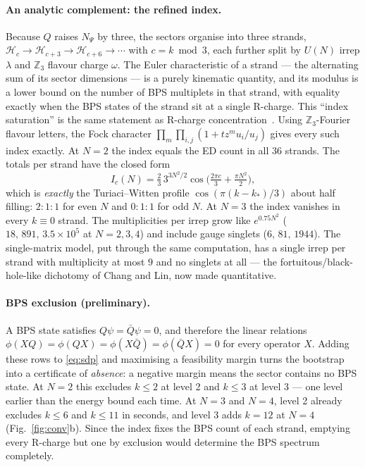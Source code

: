 \documentclass[10pt]{article}
\newcommand{\bQ}{\bar Q}
\begin{document}
\paragraph{An analytic complement: the refined index.}
Because $Q$ raises $N_\Psi$ by three, the sectors organise into three strands, $\mathcal H_c\to\mathcal H_{c+3}\to\mathcal H_{c+6}\to\cdots$ with $c=k\bmod3$, each further split by $U(N)$ irrep $\lambda$ and $\mathbb Z_3$ flavour charge $\omega$. The Euler characteristic of a strand --- the alternating sum of its sector dimensions --- is a purely kinematic quantity, and its modulus is a lower bound on the number of BPS multiplets in that strand, with equality exactly when the BPS states of the strand sit at a single R-charge. This ``index saturation'' is the same statement as R-charge concentration~\cite{Chang:2024fortuitySYK}. Using $\mathbb Z_3$-Fourier flavour letters, the Fock character $\prod_{m}\prod_{i,j}(1+t z^m u_i/u_j)$ gives every such index exactly. At $N=2$ the index equals the ED count in all 36 strands. The totals per strand have the closed form
\begin{equation}
I_c(N)=\tfrac23\,3^{3N^2/2}\cos\!\Big(\tfrac{2\pi c}3+\tfrac{\pi N^2}2\Big),
\end{equation}
which is \emph{exactly} the Turiaci--Witten profile $\cos(\pi(k-k_*)/3)$ about half filling: $2{:}1{:}1$ for even $N$ and $0{:}1{:}1$ for odd $N$. At $N=3$ the index vanishes in every $k\equiv0$ strand. The multiplicities per irrep grow like $e^{0.75N^2}$ ($18,\,891,\,3.5\times10^5$ at $N=2,3,4$) and include gauge singlets ($6,\,81,\,1944$). The single-matrix model, put through the same computation, has a single irrep per strand with multiplicity at most $9$ and no singlets at all --- the fortuitous/black-hole-like dichotomy of Chang and Lin, now made quantitative.

\paragraph{BPS exclusion (preliminary).}
A BPS state satisfies $Q\psi=\bQ\psi=0$, and therefore the linear relations $\phi(XQ)=\phi(QX)=\phi(X\bQ)=\phi(\bQ X)=0$ for every operator $X$. Adding these rows to \eqref{eq:sdp} and maximising a feasibility margin turns the bootstrap into a certificate of \emph{absence}: a negative margin means the sector contains no BPS state. At $N=2$ this excludes $k\le2$ at level 2 and $k\le3$ at level 3 --- one level earlier than the energy bound each time. At $N=3$ and $N=4$, level 2 already excludes $k\le6$ and $k\le11$ in seconds, and level 3 adds $k=12$ at $N=4$ (Fig.~\ref{fig:conv}b). Since the index fixes the BPS count of each strand, emptying every R-charge but one by exclusion would determine the BPS spectrum completely.
\end{document}
